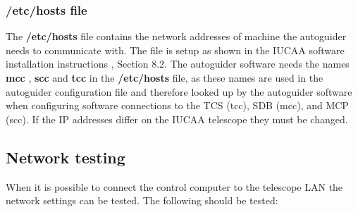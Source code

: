 \documentclass[10pt,a4paper]{article}
\begin{document}
\subsubsection{/etc/hosts file}

The {\bf /etc/hosts} file contains the network addresses of machine the autoguider needs to communicate with. The file is setup as shown in the IUCAA software installation instructions \cite{bib:iucaasoftwareinstallation}, Section 8.2. The autoguider software needs the names {\bf mcc} , {\bf scc} and {\bf tcc} in the {\bf /etc/hosts} file, as these names are used in the autoguider configuration file and therefore looked up by the autoguider software when configuring software connections to the TCS (tcc), SDB (mcc), and MCP (scc). If the IP addresses differ on the IUCAA telescope they must be changed.

\subsection{Network testing}
\label{sec:networktesting}

When it is possible to connect the control computer to the telescope LAN the network settings can be tested. The following should be tested:
\end{document}
